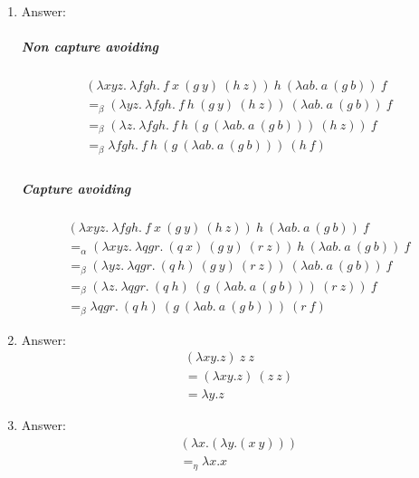 \documentclass{article}
\begin{document}
\begin{enumerate}
	\item Answer: 
		\subparagraph{Non capture avoiding}
			\begin{align*}
				&(\lambda xyz.\ \lambda fgh.\ f\ x\ (g\ y)\ (h\ z))\ h\ (\lambda ab.\ a\
				(g\ b))\ f&\\
				&=_{\beta} (\lambda yz.\ \lambda fgh.\ f\ h\ (g\ y)\ (h\ z))\ (\lambda ab.\ a\
				(g\ b))\ f&\\
				&=_{\beta} (\lambda z.\ \lambda fgh.\ f\ h\ (g\ (\lambda ab.\ a\ (g\
				b)))\ (h\ z))\ f&\\
				&=_{\beta} \lambda fgh.\ f\ h\ (g\ (\lambda ab.\ a\ (g\ b)))\ (h\ f)&\\
			\end{align*}
		\subparagraph{Capture avoiding}
			\begin{align*}
				&(\lambda xyz.\ \lambda fgh.\ f\ x\ (g\ y)\ (h\ z))\ h\ (\lambda ab.\ a\
				(g\ b))\ f&\\
				&=_{\alpha} (\lambda xyz.\ \lambda qgr.\ (q\ x)\ (g\ y)\ (r\ z))\ h\ (\lambda ab.\ a\
				(g\ b))\ f&\\
				&=_{\beta} (\lambda yz.\ \lambda qgr.\ (q\ h)\ (g\ y)\ (r\ z))\ (\lambda ab.\ a\
				(g\ b))\ f&\\
				&=_{\beta} (\lambda z.\ \lambda qgr.\ (q\ h)\ (g\ (\lambda ab.\ a\ (g\
				b)))\ (r\ z))\ f&\\
				&=_{\beta} \lambda qgr.\ (q\ h)\ (g\ (\lambda ab.\ a\ (g\
				b)))\ (r\ f)&
			\end{align*}

	\item Answer: 
		\begin{align*}
			&(\lambda xy.z)\ z\ z&\\
			&=  (\lambda xy.z)\ (z\ z)&\\
			&=  \lambda y.z &
		\end{align*}

	\item Answer: 
		\begin{align*}
			&(\lambda x.(\lambda y.(x\ y)))&\\
			&=_{\eta}  \lambda x.x&\\
		\end{align*}


\end{enumerate}
\end{document}
